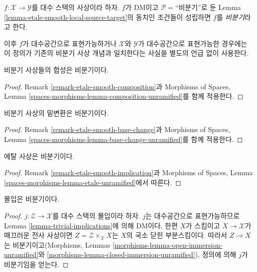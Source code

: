 \begin{definition}
\label{definition-unramified}
$f : \mathcal{X} \to \mathcal{Y}$를 대수 스택의 사상이라 하자.
$f$가 DM이고 $\mathcal{P} =$``비분기''로 둔 Lemma
\ref{lemma-etale-smooth-local-source-target}의 동치인 조건들이 성립하면
$f$를 {\it 비분기}라고 한다.
\end{definition}

\noindent
이후 $f$가 대수공간으로 표현가능하거나 $\mathcal{X}$와 $\mathcal{Y}$가
대수공간으로 표현가능한 경우에는 이 정의가 기존의 비분기 사상 개념과
일치한다는 사실을 별도의 언급 없이 사용한다.

\begin{lemma}
\label{lemma-composition-unramified}
비분기 사상들의 합성은 비분기이다.
\end{lemma}

\begin{proof}
Remark \ref{remark-etale-smooth-composition}과 Morphisms of Spaces, Lemma
\ref{spaces-morphisms-lemma-composition-unramified}를 함께 적용한다.
\end{proof}

\begin{lemma}
\label{lemma-base-change-unramified}
비분기 사상의 밑변환은 비분기이다.
\end{lemma}

\begin{proof}
Remark \ref{remark-etale-smooth-base-change}과 Morphisms of Spaces, Lemma
\ref{spaces-morphisms-lemma-base-change-unramified}를 함께 적용한다.
\end{proof}

\begin{lemma}
\label{lemma-etale-unramified}
에탈 사상은 비분기이다.
\end{lemma}

\begin{proof}
Remark \ref{remark-etale-smooth-implication}과 Morphisms of Spaces, Lemma
\ref{spaces-morphisms-lemma-etale-unramified}에서 따른다.
\end{proof}

\begin{lemma}
\label{lemma-immersion-unramified}
몰입은 비분기이다.
\end{lemma}

\begin{proof}
$j : \mathcal{Z} \to \mathcal{X}$를 대수 스택의 몰입이라 하자.
$j$는 대수공간으로 표현가능하므로 Lemma
\ref{lemma-trivial-implications}에 의해 DM이다. 한편 $X$가 스킴이고
$X \to \mathcal{X}$가 매끄러운 전사 사상이면
$Z = \mathcal{Z} \times_\mathcal{X} X$는 $X$의 국소 닫힌 부분스킴이다.
따라서 $Z \to X$는 비분기이고(Morphisms, Lemmas
\ref{morphisms-lemma-open-immersion-unramified}와
\ref{morphisms-lemma-closed-immersion-unramified}), 정의에 의해 $j$가
비분기임을 얻는다.
\end{proof}

